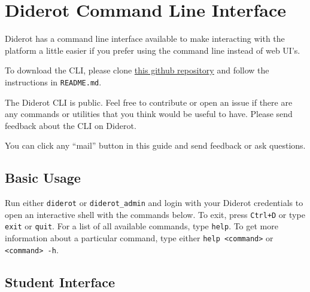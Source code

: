 \chapter{Diderot Command Line Interface}

Diderot has a command line interface available to make interacting
with the platform a little easier if you prefer using the command
line instead of web UI's.

\begin{important}


To download the CLI, please clone 
%
\href{https://github.com/diderot-edu/diderot-cli}{this github repository}
%
and follow the instructions in \lstinline`README.md`. 

The Diderot CLI is public. Feel free to contribute or open an issue if there
are any commands or utilities that you think would be useful to have. Please
send feedback about the CLI on Diderot.
\end{important}

\begin{note}
You can click any ``mail''  button in this guide and send feedback or ask questions. 
\end{note}

\section{Basic Usage}

Run either \verb|diderot| or \verb|diderot_admin| and login with your Diderot credentials to open an interactive shell with the commands below.
%
To exit, press \verb|Ctrl+D| or type \verb|exit| or \verb|quit|.
%
For a list of all available commands, type \verb|help|. To get more information
about a particular command, type either \verb|help <command>| or \verb|<command> -h|.

\section{Student Interface}


